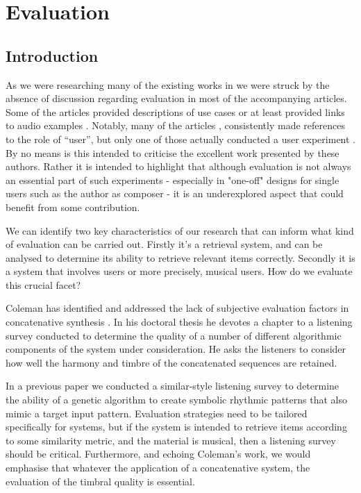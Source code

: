 \chapter{Evaluation}
\label{chap:evaluation}

\section{Introduction}

As we were researching many of the existing works in  we were struck by the absence of discussion regarding evaluation in most of the accompanying articles. Some of the articles provided descriptions of use cases \citep{Cardle2003} or at least provided links to audio examples \citep{Sturm2004}. Notably, many of the articles \citep{Simon2005}, \citep{Hackbarth2010} consistently made references to the role of “user”, but only one of those actually conducted a user experiment \citep{Aucouturier2005}. By no means is this intended to criticise the excellent work presented by these authors. Rather it is intended to highlight that although evaluation is not always an essential part of such experiments - especially in "one-off" designs for single users such as the author as composer - it is an underexplored aspect that could benefit from some contribution.

We can identify two key characteristics of our research that can inform what kind of evaluation can be carried out. Firstly it’s a retrieval system, and can be analysed to determine its ability to retrieve relevant items correctly. Secondly it is a system that involves users or more precisely, musical users. How do we evaluate this crucial facet?

Coleman has identified and addressed the lack of subjective evaluation factors in concatenative synthesis \citep{Coleman2015}. In his doctoral thesis he devotes a chapter to a listening survey conducted to determine the quality of a number of different algorithmic components of the system under consideration. He asks the listeners to consider how well the harmony and timbre of the concatenated sequences are retained.

In a previous paper we conducted a similar-style listening survey to determine the ability of a genetic algorithm to create symbolic rhythmic patterns that also mimic a target input pattern. Evaluation strategies need to be tailored specifically for systems, but if the system is intended to retrieve items according to some similarity metric, and the material is musical, then a listening survey should be critical. Furthermore, and echoing Coleman's work, we would emphasise that whatever the application of a concatenative system, the evaluation of the timbral quality is essential.

